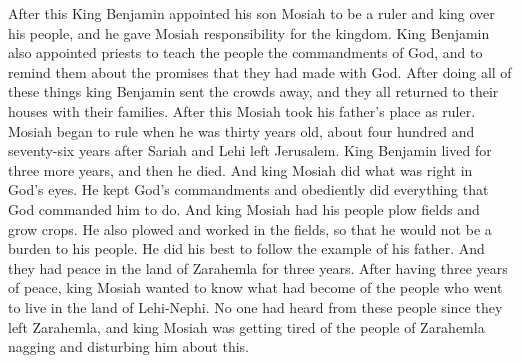 After this King Benjamin appointed his son Mosiah to be a ruler and king over his people, and he gave Mosiah responsibility for the kingdom. King Benjamin also appointed priests to teach the people the commandments of God, and to remind them about the promises that they had made with God. After doing all of these things king Benjamin sent the crowds away, and they all returned to their houses with their families.
\bverse \iffalse And Mosiah began to reign in his father's stead. And he began to reign in the thirtieth year of his age, making in the whole, about four hundred and seventy-six years from the time that Lehi left Jerusalem. \fi
After this Mosiah took his father's place as ruler. Mosiah began to rule when he was thirty years old, about four hundred and seventy-six years after Sariah and Lehi left Jerusalem.
\bverse \iffalse And king Benjamin lived three years and he died. \fi
King Benjamin lived for three more years, and then he died.
\bverse \iffalse And it came to pass that king Mosiah did walk in the ways of the Lord, and did observe his judgments and his statutes, and did keep his commandments in all things whatsoever he commanded him. \fi
And king Mosiah did what was right in God's eyes. He kept God's commandments and obediently did everything that God commanded him to do.
\bverse \iffalse And king Mosiah did cause his people that they should till the earth. And he also, himself, did till the earth, that thereby he might not become burdensome to his people, that he might do according to that which his father had done in all things. And there was no contention among all his people for the space of three years. \fi
And king Mosiah had his people plow fields and grow crops. He also plowed and worked in the fields, so that he would not be a burden to his people. He did his best to follow the example of his father. And they had peace in the land of Zarahemla for three years.
\bchapter
\bverse \iffalse And now, it came to pass that after king Mosiah had had continual peace for the space of three years, he was desirous to know concerning the people who went up to dwell in the land of Lehi-Nephi, or in the city of Lehi-Nephi; for his people had heard nothing from them from the time they left the land of Zarahemla; therefore, they wearied him with their teasings. \fi
After having three years of peace, king Mosiah wanted to know what had become of the people who went to live in the land of Lehi-Nephi. No one had heard from these people since they left Zarahemla, and king Mosiah was getting tired of the people of Zarahemla nagging and disturbing him about this.
